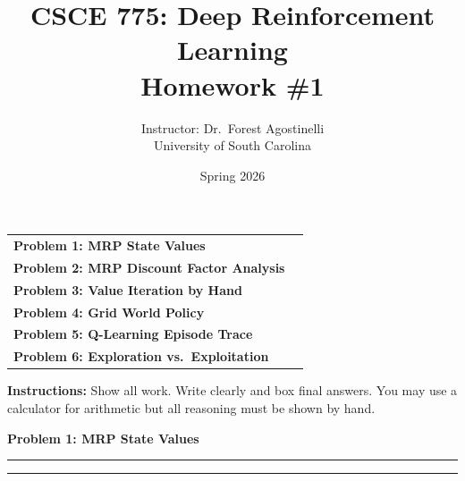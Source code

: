 \documentclass[12pt]{article}
\title{CSCE 775: Deep Reinforcement Learning \\ Homework \#1}
\author{Instructor: Dr.\ Forest Agostinelli \\ University of South Carolina}
\date{Spring 2026}
\newcommand{\question}[1]{%
  \clearpage
  \vspace{0.5cm}
  {\noindent\normalsize \textbf{#1}}
  \vspace{0.2cm}
  \hrule
  \vspace{0.1cm}
  \hrule
  \vspace{0.3cm}
}
\begin{document}
\maketitle
\setlength{\parindent}{0pt}



\begin{center}
\begin{tcolorbox}[colback=white, colframe=gray!50!black, colbacktitle=gray!20!white,
                  coltitle=black, sharp corners, boxrule=1pt,
                  title=\Large\bfseries Table of Contents]
\begin{tabular}{p{}r}
\textbf{Problem 1: MRP State Values} \dotfill & \textbf{\pageref{prob:mrp}} \\[0.3em]
\textbf{Problem 2: MRP Discount Factor Analysis} \dotfill & \textbf{\pageref{prob:discount}} \\[0.3em]
\textbf{Problem 3: Value Iteration by Hand} \dotfill & \textbf{\pageref{prob:vi}} \\[0.3em]
\textbf{Problem 4: Grid World Policy} \dotfill & \textbf{\pageref{prob:grid}} \\[0.3em]
\textbf{Problem 5: Q-Learning Episode Trace} \dotfill & \textbf{\pageref{prob:qlearn}} \\[0.3em]
\textbf{Problem 6: Exploration vs.\ Exploitation} \dotfill & \textbf{\pageref{prob:explore}} \\
\end{tabular}
\vspace{0.2cm}
\end{tcolorbox}
\end{center}

\vspace{0.3cm}

\noindent\textbf{Instructions:} Show all work. Write clearly and box final answers. You may use a calculator for arithmetic but all reasoning must be shown by hand.


\question{Problem 1: MRP State Values}\label{prob:mrp}
\end{document}
